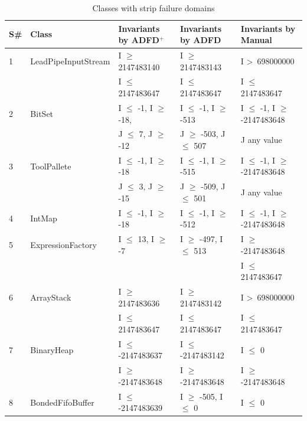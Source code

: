 \clearpage
\newpage
{\scriptsize

\begin{longtable}{|l|l|l|l|l|}
\caption{Classes with strip failure domains}\\
\hline
S\#  & Class						& Invariants by ADFD$^+$       		& Invariants by ADFD     			& Invariants by Manual	\\
  \hline
  \endhead
1	&LeadPipeInputStream 		& I $\ge$ 2147483140			& I $\ge$ 2147483143			& I \textgreater~698000000					\\ 
	&                                             & I $\le$ 2147483647	  		& I $\le$ 2147483647 			& I $\le$ 2147483647					\\
2	& BitSet				  		& I $\le$ -1, I $\ge$ -18,			& I $\le$ -1, I $\ge$ -513			& I $\le$ -1, I $\ge$ -2147483648	\\ 
	&                                             & J $\le$ 7, J $\ge$ -12  			& J $\ge$ -503, J $\le$ 507		& J any value									\\ %
3	& ToolPallete			  		& I $\le$ -1, I $\ge$ -18			& I $\le$ -1, I $\ge$ -515			& I $\le$ -1, I $\ge$ -2147483648	\\ 
	&                                             & J $\le$ 3, J $\ge$ -15			& J $\ge$ -509, J $\le$ 501		& J any value			   						\\
4	& IntMap			  		& I $\le$ -1, I $\ge$ -18			& I $\le$ -1, I $\ge$ -512			& I $\le$ -1, I $\ge$ -2147483648	\\
5	& ExpressionFactory	  		& I $\le$ 13, I $\ge$ -7			& I $\ge$ -497, I $\le$ 513		& I $\ge$ -2147483648 				\\ %
	&                                             & 								&								& I $\le$ 2147483647					\\
6	& ArrayStack					& I $\ge$ 2147483636			& I $\ge$ 2147483142			& I \textgreater~698000000 					\\ 
	&                                             & I $\le$ 2147483647 			& I $\le$ 2147483647 			& I $\le$ 2147483647 					\\
7	& BinaryHeap				& I $\le$ -2147483637			& I $\le$ -2147483142			& I $\le$ 0								 \\	
	&                                             & I $\ge$ -2147483648			& I $\ge$ -2147483648			& I $\ge$ -2147483648				\\
8	& BondedFifoBuffer			& I $\le$ -2147483639 			& I $\ge$ -505, I $\le$ 0			& I $\le$ 0 								\\

\end{longtable}}
